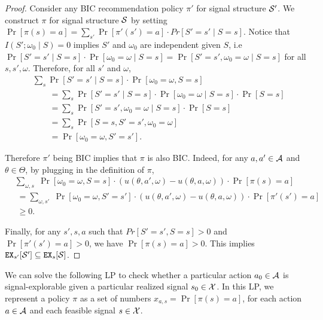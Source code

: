 \begin{proof}
Consider any BIC recommendation policy $\pi'$ for signal structure $\S'$. We construct $\pi$ for signal structure $\S$ by setting $\Pr[\pi(s) = a] = \sum_{s'} \Pr[\pi'(s') = a] \cdot Pr[S' = s'\mid S = s]$. Notice that $I(S' ; \omega_0\mid S) = 0$ implies $S'$ and $\omega_0$ are independent given $S$, i.e $\Pr[S' = s'\mid S=s] \cdot \Pr[\omega_0 = \omega\mid S=s] = \Pr[S'=s', \omega_0 = \omega\mid S=s]$ for all $s,s',\omega$. Therefore, for all $s'$ and $\omega$,
\begin{align*}
& \textstyle \sum_s \Pr[S' = s'\mid S = s] \cdot \Pr[\omega_0 = \omega, S= s]\\
&\qquad=\textstyle \sum_s \Pr[S' = s'\mid S=s]
    \cdot \Pr[\omega_0 = \omega\mid S=s] \cdot \Pr[S=s] \\
&\qquad= \textstyle  \sum_s \Pr[S'=s',\omega_0 =\omega\mid S=s] \cdot \Pr[S=s] \\
&\qquad=\textstyle  \sum_s \Pr[S=s,S'=s',\omega_0 =\omega] \\
&\qquad=\Pr[\omega_0 =\omega, S'=s'].
\end{align*}

Therefore $\pi'$ being BIC implies that $\pi$ is also BIC. Indeed, for any $a,a' \in \A$ and $\theta \in \varTheta$, by plugging in the definition of $\pi$,
\begin{align*}
&\textstyle \sum_{\omega,s}\; \Pr[\omega_0 = \omega, S = s] \cdot (u(\theta,a', \omega) - u(\theta,a,\omega)) \cdot \Pr[\pi(s) = a] \\
&\;= \textstyle \sum_{\omega,s'}\;\Pr[\omega_0 = \omega, S' = s'] \cdot (u(\theta,a', \omega) - u(\theta,a,\omega)) \cdot \Pr[\pi'(s') = a]\\
&\;\geq 0.
\end{align*}


Finally, for any $s', s ,a$ such that $Pr[S' = s',S = s] >0 $ and $\Pr[\pi'(s') = a] >0$, we have $\Pr[\pi(s) = a] > 0$. This implies $\EX_{s'}[\S'] \subseteq \EX_s[\S]$.
\end{proof}

We can solve the following LP to check whether a particular action $a_0 \in\A$ is signal-explorable given a particular realized signal $s_0\in\X$. In this LP, we represent a policy $\pi$ as a set of numbers
    $x_{a,s} = \Pr[\pi(s)=a]$,
for each action $a\in \A$ and each feasible signal $s\in \X$.

